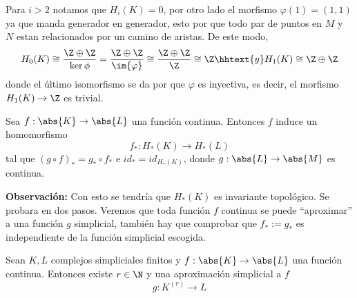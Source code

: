 \documentclass{article}
\begin{document}
\vspace{2mm}
\centerline{
}

\vspace{2mm}
\noindent Para $i>2$ notamos que $H_{i}(K)=0$, por otro lado el morfismo $\varphi(1)=(1,1)$ ya que
manda generador en generador, esto por que todo par de puntos en $M$ y $N$ estan relacionados por
un camino de aristas. De este modo,
\begin{equation*}
    H_{0}(K)\cong\frac{\Z\oplus\Z}{\ker{\phi}}=\frac{\Z\oplus\Z}{\im{\varphi}}
    \cong\frac{\Z\oplus\Z}{\Z}\cong\Z
    \hhtext{y}
    H_{1}(K)\cong\Z\oplus\Z
\end{equation*}
donde el último isomorfismo se da por que $\varphi$ es inyectiva, es decir, el morfismo 
$H_{1}(K)\to\Z$ es trivial.

\begin{teo}
    Sea $f:\abs{K}\to\abs{L}$ una función continua. Entonces $f$ induce un homomorfismo
    \begin{equation*}
        f_{*}:H_{*}(K)\to H_{*}(L)
    \end{equation*}
    tal que $(g\circ f)_{*}=g_{*}\circ f_{*}$ e $id_{*}=id_{H_{*}(K)}$, donde 
    $g:\abs{L}\to\abs{M}$ es continua.
\end{teo}

\noindent\textbf{Observación:} Con esto se tendría que $H_{*}(K)$ es invariante topológico. Se
probara en dos pasos. Veremos que toda función $f$ continua se puede ``aproximar'' a una función 
$g$ simplicial, también hay que comprobar que $f_{*}:=g_{*}$ es independiente de la función 
simplicial escogida.

\begin{teo}
    Sean $K,L$ complejos simpliciales finitos y $f:\abs{K}\to\abs{L}$ una función continua. 
    Entonces existe $r\in\N$ y una aproximación simplicial a $f$
    \begin{equation*}
        g:K^{(r)}\to L
    \end{equation*}
\end{teo}
\end{document}
